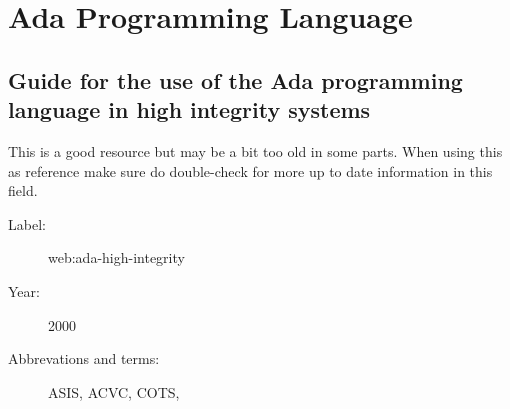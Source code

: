 \chapter{Ada Programming Language}

\section{Guide for the use of the Ada programming language in high integrity
systems}

This is a good resource but may be a bit too old in some parts. When using this
as reference make sure do double-check for more up to date information in this
field.

\begin{description}
    \item[Label:] web:ada-high-integrity \cite{web:ada-high-integrity}
    \item[Year:] 2000
    \item[Abbrevations and terms:]
        ASIS,
        ACVC,
        COTS,
\end{description}


